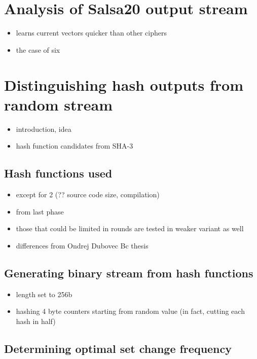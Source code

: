 \documentclass[12pt,oneside]{fithesis2}
\begin{document}
\chapter{Analysis of Salsa20 output stream}
\label{chap:analysis-salsa}
\begin{itemize}
\item learns current vectors quicker than other ciphers
\item the case of six
\end{itemize}

\chapter{Distinguishing hash outputs from random stream}
\label{chap:distinguish-hash}

\begin{itemize}
\item introduction, idea
\item hash function candidates from SHA-3
\end{itemize}

\section{Hash functions used}
\label{sec:hash-functions}

\begin{itemize}
\item except for 2 (?? source code size, compilation)
\item from last phase
\item those that could be limited in rounds are tested in weaker variant as well
\item differences from Ondrej Dubovec Bc thesis
\end{itemize}

\section{Generating binary stream from hash functions}
\label{sec:hash-settings}

\begin{itemize}
\item length set to 256b
\item hashing 4 byte counters starting from random value (in fact, cutting each hash in half)
\end{itemize}

\section{Determining optimal set change frequency}
\label{sec:hash-set-change-freqency}
\end{document}
